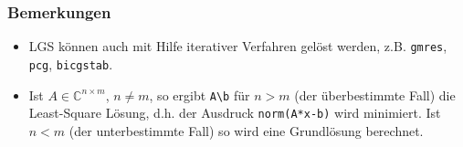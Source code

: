 % 
%
\begin{frame}[fragile]\frametitle{Bemerkungen}
\begin{itemize}
\item LGS können auch mit Hilfe iterativer Verfahren gelöst werden,
  z.B. \lstinline!gmres!, \lstinline!pcg!, \lstinline!bicgstab!.
\item Ist $A\in \mathbb{C}^{n \times m}$, $n \neq m$, so ergibt \lstinline!A\b!
  für $n>m$ (der überbestimmte Fall) die Least-Square Lösung, d.h. der Ausdruck
  \lstinline!norm(A*x-b)! wird minimiert. Ist $n<m$ (der unterbestimmte
  Fall) so wird eine Grundlösung berechnet. 
\end{itemize}
\end{frame}


